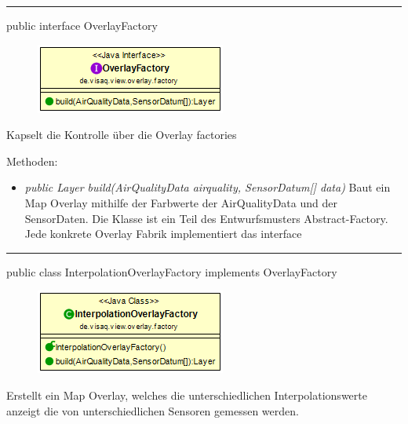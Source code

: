 
\rule{\textwidth}{0.4pt}
public interface OverlayFactory

\begin{minipage}{0.3\textwidth}
    \begin{figure}[H]
        \includegraphics[scale = 0.5
        ]{media/frontend/view/de.view.overlay.factory/OverlayFactory_Class.png}
    \end{figure}
    \end{minipage} \hfill
    \begin{minipage}{0.6\textwidth}
Kapselt die Kontrolle über die Overlay factories
\end{minipage}

Methoden:
\begin{itemize}
    \item \emph{public Layer build(AirQualityData airquality, SensorDatum[] data)}  Baut ein Map Overlay mithilfe der Farbwerte der AirQualityData und der SensorDaten. Die Klasse ist ein Teil des Entwurfsmusters Abstract-Factory. Jede konkrete Overlay Fabrik implementiert das interface
\end{itemize}

\clearpage %
\rule{\textwidth}{0.4pt}
public class InterpolationOverlayFactory implements OverlayFactory

\begin{minipage}{0.3\textwidth}
    \begin{figure}[H]
        \includegraphics[scale = 0.5]{media/frontend/view/de.view.overlay.factory/InterpolationOverlayFactory_Class.png}
    \end{figure}
    \end{minipage} \hfill
    \begin{minipage}{0.6\textwidth}
Erstellt ein Map Overlay, welches die unterschiedlichen Interpolationswerte anzeigt die von unterschiedlichen Sensoren gemessen werden.
\end{minipage}

